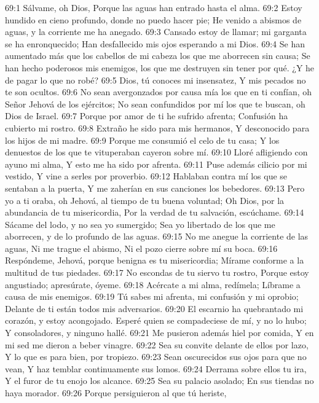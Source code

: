 69:1 Sálvame, oh Dios, 
Porque las aguas han entrado hasta el alma. 
69:2 Estoy hundido en cieno profundo, donde no puedo hacer pie; 
He venido a abismos de aguas, y la corriente me ha anegado. 
69:3 Cansado estoy de llamar; mi garganta se ha enronquecido; 
Han desfallecido mis ojos esperando a mi Dios. 
69:4 Se han aumentado más que los cabellos de mi cabeza los que me aborrecen sin causa; 
Se han hecho poderosos mis enemigos, los que me destruyen sin tener por qué. 
¿Y he de pagar lo que no robé? 
69:5 Dios, tú conoces mi insensatez, 
Y mis pecados no te son ocultos. 
69:6 No sean avergonzados por causa mía los que en ti confían, oh Señor Jehová de los ejércitos; 
No sean confundidos por mí los que te buscan, oh Dios de Israel. 
69:7 Porque por amor de ti he sufrido afrenta; 
Confusión ha cubierto mi rostro. 
69:8 Extraño he sido para mis hermanos, 
Y desconocido para los hijos de mi madre. 
69:9 Porque me consumió el celo de tu casa; 
Y los denuestos de los que te vituperaban cayeron sobre mí. 
69:10 Lloré afligiendo con ayuno mi alma, 
Y esto me ha sido por afrenta. 
69:11 Puse además cilicio por mi vestido, 
Y vine a serles por proverbio. 
69:12 Hablaban contra mí los que se sentaban a la puerta, 
Y me zaherían en sus canciones los bebedores. 
69:13 Pero yo a ti oraba, oh Jehová, al tiempo de tu buena voluntad; 
Oh Dios, por la abundancia de tu misericordia, 
Por la verdad de tu salvación, escúchame. 
69:14 Sácame del lodo, y no sea yo sumergido; 
Sea yo libertado de los que me aborrecen, y de lo profundo de las aguas. 
69:15 No me anegue la corriente de las aguas, 
Ni me trague el abismo, 
Ni el pozo cierre sobre mí su boca. 
69:16 Respóndeme, Jehová, porque benigna es tu misericordia; 
Mírame conforme a la multitud de tus piedades. 
69:17 No escondas de tu siervo tu rostro, 
Porque estoy angustiado; apresúrate, óyeme. 
69:18 Acércate a mi alma, redímela; 
Líbrame a causa de mis enemigos. 
69:19 Tú sabes mi afrenta, mi confusión y mi oprobio; 
Delante de ti están todos mis adversarios. 
69:20 El escarnio ha quebrantado mi corazón, y estoy acongojado. 
Esperé quien se compadeciese de mí, y no lo hubo; 
Y consoladores, y ninguno hallé. 
69:21 Me pusieron además hiel por comida, 
Y en mi sed me dieron a beber vinagre. 
69:22 Sea su convite delante de ellos por lazo, 
Y lo que es para bien, por tropiezo. 
69:23 Sean oscurecidos sus ojos para que no vean, 
Y haz temblar continuamente sus lomos. 
69:24 Derrama sobre ellos tu ira, 
Y el furor de tu enojo los alcance. 
69:25 Sea su palacio asolado; 
En sus tiendas no haya morador. 
69:26 Porque persiguieron al que tú heriste, 
